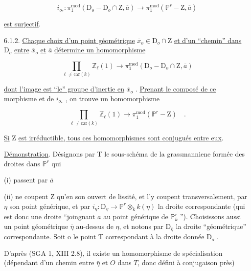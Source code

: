 \begin{equation}\tag{6.1.1.1}
i_{o_*} : \pi_1^{\mathrm{mod}}(\mathrm{D}_o - \mathrm{D}_o \cap \mathrm{Z}, \overline{a}) \longrightarrow \pi_1^{\mathrm{mod}}(\mathbb{P}^r - \mathrm{Z}, \overline{a})
\end{equation}

\underline{est surjectif}.

6.1.2. \underline{Chaque choix d'un point géométrique} $\overline{x}_o \in \mathrm{D}_o \cap \mathrm{Z}$ \underline{et d'un ``chemin'' dans} $\mathrm{D}_o$ \underline{entre} $\overline{x}_o$ \underline{et} $\overline{a}$ \underline{détermine un homomorphisme}

\begin{equation}\tag{6.1.2.1}
\prod\limits_{\ell \neq \mathrm{car}(k)} \mathbb{Z}_\ell(1) \longrightarrow \pi_1^{\mathrm{mod}}(\mathrm{D}_o - \mathrm{D}_o \cap \mathrm{Z}, \overline{a})
\end{equation}

\underline{dont l'image est ``le'' groupe d'inertie en} $\overline{x}_o$ . \underline{Prenant le composé de ce morphisme et de} $i_{o_*}$ , \underline{on trouve un homomorphisme}

\begin{equation}\tag{6.1.2.2}
\prod\limits_{\ell \neq \mathrm{car}(k)} \mathbb{Z}_\ell(1) \longrightarrow \pi_1^{\mathrm{mod}}(\mathbb{P}^r - \mathrm{Z}) \quad .
\end{equation}

\underline{Si} Z \underline{est irréductible, tous ces homomorphismes sont conjugués entre eux}.

\underline{Démonstration}. Désignons par T le sous-schéma de la grassmanniene formée des droites dans $\mathbb{P}^r$ qui

(i) passent par $\overline{a}$

(ii) ne coupent Z qu'en son ouvert de lissité, et l'y coupent transversalement, par $\eta$ son point générique, et par $i_\eta : \mathrm{D}_\eta \longrightarrow \mathbb{P}^r \otimes_k k(\eta)$ la droite correspondante (qui est donc une droite ``joingnant $\overline{a}$ au point générique de $\mathbb{P}^r_k$ ''). Choisissons aussi un point géométrique $\overline{\eta}$ au-dessus de $\eta$, et notons par $\mathrm{D}_{\overline{\eta}}$ la droite ``géométrique'' correspondante. Soit o le point T correspondant à la droite donnée $\mathrm{D}_o$ .



D'après (SGA 1, XIII 2.8), il existe un homomorphisme de spécialisation (dépendant d'un chemin entre $\bar{\eta}$ et $O$ dans $T$, donc défini à conjugaison près)

